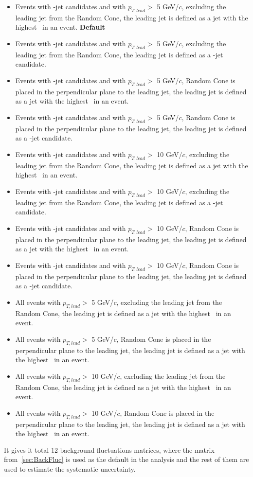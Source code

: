 \begin{itemize}
\item Events with \Dzero-jet candidates and with $p_{T, lead}>$ 5 GeV/$c$, excluding the leading jet from the Random Cone, the leading jet is defined as a jet with the highest \pt\ in an event. \textbf{Default}
\item Events with \Dzero-jet candidates and with $p_{T, lead}>$ 5 GeV/$c$, excluding the leading jet from the Random Cone, the leading jet is defined as a \Dzero-jet candidate.
\item Events with \Dzero-jet candidates and with $p_{T, lead}>$ 5 GeV/$c$, Random Cone is placed in the perpendicular plane to the leading jet, the leading jet is defined as a jet with the highest \pt\ in an event.
\item Events with \Dzero-jet candidates and with $p_{T, lead}>$ 5 GeV/$c$, Random Cone is placed in the perpendicular plane to the leading jet, the leading jet is defined as a \Dzero-jet candidate.
\item Events with \Dzero-jet candidates and with $p_{T, lead}>$ 10 GeV/$c$, excluding the leading jet from the Random Cone, the leading jet is defined as a jet with the highest \pt\ in an event.
\item Events with \Dzero-jet candidates and with $p_{T, lead}>$ 10 GeV/$c$, excluding the leading jet from the Random Cone, the leading jet is defined as a \Dzero-jet candidate.
\item Events with \Dzero-jet candidates and with $p_{T, lead}>$ 10 GeV/$c$, Random Cone is placed in the perpendicular plane to the leading jet, the leading jet is defined as a jet with the highest \pt\ in an event.
\item Events with \Dzero-jet candidates and with $p_{T, lead}>$ 10 GeV/$c$, Random Cone is placed in the perpendicular plane to the leading jet, the leading jet is defined as a \Dzero-jet candidate.
\item All events with $p_{T, lead}>$ 5 GeV/$c$, excluding the leading jet from the Random Cone, the leading jet is defined as a jet with the highest \pt\ in an event. 
\item All events with $p_{T, lead}>$ 5 GeV/$c$, Random Cone is placed in the perpendicular plane to the leading jet, the leading jet is defined as a jet with the highest \pt\ in an event.
\item All events with $p_{T, lead}>$ 10 GeV/$c$, excluding the leading jet from the Random Cone, the leading jet is defined as a jet with the highest \pt\ in an event. 
\item All events with $p_{T, lead}>$ 10 GeV/$c$, Random Cone is placed in the perpendicular plane to the leading jet, the leading jet is defined as a jet with the highest \pt\ in an event.
\end{itemize}
It gives it total 12 background fluctuations matrices, where the matrix from~\ref{sec:BackFluc} is used as the default in the analysis and the rest of them are used to estimate the systematic uncertainty. 


